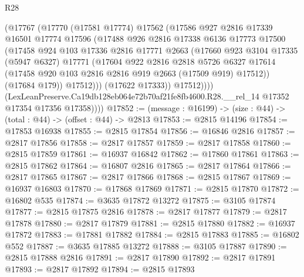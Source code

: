 \begin{lexlean}{R28}
\begin{coremodule}
                (@17767
                  (@17770
                    (@17581 @17774)
                    @17562
                    (@17586
                      @927
                      @2816
                      @17339
                      @16501
                      @17774
                      @17596
                      (@17488
                        @926
                        @2816
                        @17338
                        @6136
                        @17773
                        @17500
                        (@17458
                          @924
                          @103
                          @17336
                          @2816
                          @17771
                          @2663
                          (@17660
                            @923
                            @3104
                            @17335
                            (@5947 @6327)
                            @17771
                            (@17604
                              @922
                              @2816
                              @2818
                              @5726
                              @6327
                              @17614
                              (@17458 @920 @103 @2816 @2816 @919 @2663 (@17509 @919) @17512))
                            (@17684 @179))
                          @17512)))
                    (@17622 @17333))
                  @17512))))
          (LexLeanPreserve.Ca19db128eb064e72b70af21fe8fb4600.R28.__rel_14
            @17352
            @17354
            @17356
            @17358))))
@17852 := (message : @16199) -> (size : @44) -> (total : @44) -> (offset : @44) -> @2813
@17853 := @2815 @14196
@17854 := @17853 @16938
@17855 := @2815 @17854
@17856 := @16846 @2816
@17857 := @2817 @17856
@17858 := @2817 @17857
@17859 := @2817 @17858
@17860 := @2815 @17859
@17861 := @16937 @16842
@17862 := @17860 @17861
@17863 := @2815 @17862
@17864 := @16807 @2816
@17865 := @2817 @17864
@17866 := @2817 @17865
@17867 := @2817 @17866
@17868 := @2815 @17867
@17869 := @16937 @16803
@17870 := @17868 @17869
@17871 := @2815 @17870
@17872 := @16802 @535
@17874 := @3635 @17872 @13272
@17875 := @3105 @17874
@17877 := @2815 @17875 @2816
@17878 := @2817 @17877
@17879 := @2817 @17878
@17880 := @2817 @17879
@17881 := @2815 @17880
@17882 := @16937 @17872
@17883 := @17881 @17882
@17884 := @2815 @17883
@17885 := @16802 @552
@17887 := @3635 @17885 @13272
@17888 := @3105 @17887
@17890 := @2815 @17888 @2816
@17891 := @2817 @17890
@17892 := @2817 @17891
@17893 := @2817 @17892
@17894 := @2815 @17893

\end{coremodule}
\end{lexlean}

